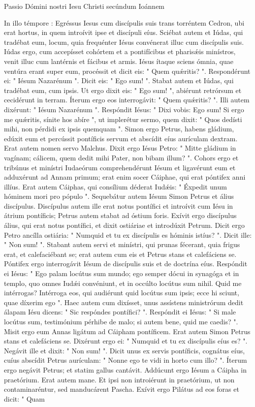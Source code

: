 
Passio Dómini nostri Iesu Christi secúndum Ioánnem

In illo témpore : Egréssus Iesus cum discípulis suis trans torréntem Cedron, ubi erat hortus, in quem introívit ipse et discípuli eíus. Sciébat autem et Iúdas, qui tradébat eum, locum, quia frequénter Iésus convénerat illuc cum discípulis suis. Iúdas ergo, cum accepísset cohórtem et a pontifícibus et pharisǽis minístros, venit illuc cum lantérnis et fácibus et armis. Iésus ítaque sciens ómnia, quae ventúra erant super eum, procéssit et dicit eis: " Quem quǽritis? ". Respondérunt ei: " Iésum Nazarénum ". Dicit eis: " Ego sum! ". Stabat autem et Iúdas, qui tradébat eum, cum ipsis. Ut ergo dixit eis: " Ego sum! ", abiérunt retrórsum et cecidérunt in terram. Íterum ergo eos interrogávit: " Quem quǽritis? ". Illi autem dixérunt: " Iésum Nazarénum ". Respóndit Iésus: " Dixi vobis: Ego sum! Si ergo me quǽritis, sínite hos abíre ", ut implerétur sermo, quem dixit: " Quos dedísti mihi, non pérdidi ex ipsis quemquam ". Simon ergo Petrus, habens gládium, edúxit eum et percússit pontíficis servum et abscídit eíus aurículam dextram. Erat autem nomen servo Malchus. Dixit ergo Iésus Petro: " Mitte gládium in vagínam; cálicem, quem dedit mihi Pater, non bibam illum? ". Cohors ergo et tribúnus et minístri Iudaeórum comprehendérunt Iésum et ligavérunt eum et adduxérunt ad Annam primum; erat enim socer Cáiphae, qui erat póntifex anni illíus. Erat autem Cáiphas, qui consílium déderat Iudǽis: " Éxpedit unum hóminem mori pro pópulo ". Sequebátur autem Iésum Simon Petrus et álius discípulus. Discípulus autem ille erat notus pontífici et introívit cum Iésu in átrium pontíficis; Petrus autem stabat ad óstium foris. Exívit ergo discípulus álius, qui erat notus pontífici, et dixit ostiáriae et introdúxit Petrum. Dicit ergo Petro ancílla ostiária: " Numquid et tu ex discípulis es hóminis istíus? ". Dicit ille: " Non sum! ". Stabant autem servi et minístri, qui prunas fécerant, quia frigus erat, et calefaciébant se; erat autem cum eis et Petrus stans et calefáciens se. Póntifex ergo interrogávit Iésum de discípulis suis et de doctrína eíus. Respóndit ei Iésus: " Ego palam locútus sum mundo; ego semper dócui in synagóga et in templo, quo omnes Iudǽi convéniunt, et in occúlto locútus sum nihil.  Quid me intérrogas? Intérroga eos, qui audiérunt quid locútus sum ipsis; ecce hi sciunt, quae díxerim ego ".  Haec autem cum dixísset, unus assístens ministrórum dedit álapam Iésu dicens: " Sic respóndes pontífici? ". Respóndit ei Iésus: " Si male locútus sum, testimónium pérhibe de malo; si autem bene, quid me caedis? ".  Misit ergo eum Annas ligátum ad Cáipham pontíficem. Erat autem Simon Petrus stans et calefáciens se. Dixérunt ergo ei: " Numquid et tu ex discípulis eíus es? ". Negávit ille et dixit: " Non sum! ". Dicit unus ex servis pontíficis, cognátus eíus, cuíus abscídit Petrus aurículam: " Nonne ego te vidi in horto cum illo? ".  Íterum ergo negávit Petrus; et statim gallus cantávit. Addúcunt ergo Iésum a Cáipha in praetórium. Erat autem mane. Et ipsi non introiérunt in praetórium, ut non contaminaréntur, sed manducárent Pascha. Exívit ergo Pilátus ad eos foras et dicit: " Quam 